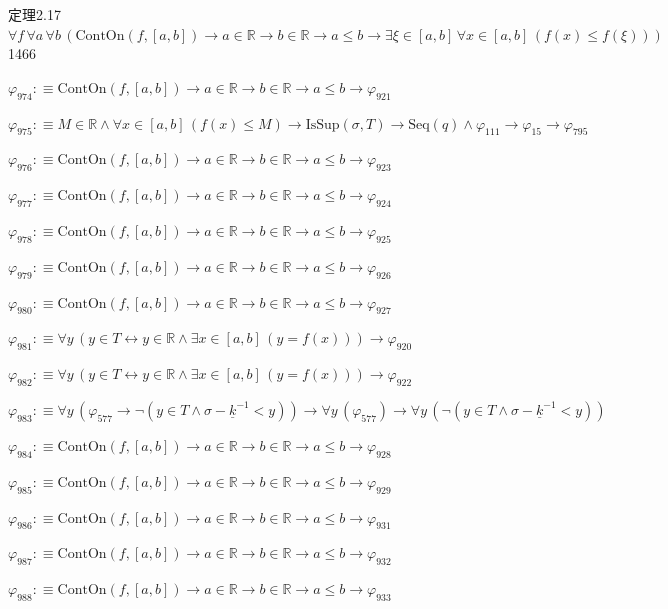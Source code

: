 \begin{fullproof}{定理2.17}{$\forall f\,\forall a\,\forall b\,(\mathrm{ContOn}(f,[a,b]) \to a \in \mathbb{R} \to b \in \mathbb{R} \to a \leq b \to \exists \xi \in [a,b]\,\forall x \in [a,b]\,(f(x) \leq f(\xi)))$}{1466}
\begin{abbrevlist}
\item $\varphi_{974} :\equiv \mathrm{ContOn}(f,[a,b]) \to a \in \mathbb{R} \to b \in \mathbb{R} \to a \leq b \to \varphi_{921}$
\item $\varphi_{975} :\equiv M \in \mathbb{R} \land \forall x \in [a,b]\,(f(x) \leq M) \to \mathrm{IsSup}(\sigma,T) \to \mathrm{Seq}(q) \land \varphi_{111} \to \varphi_{15} \to \varphi_{795}$
\item $\varphi_{976} :\equiv \mathrm{ContOn}(f,[a,b]) \to a \in \mathbb{R} \to b \in \mathbb{R} \to a \leq b \to \varphi_{923}$
\item $\varphi_{977} :\equiv \mathrm{ContOn}(f,[a,b]) \to a \in \mathbb{R} \to b \in \mathbb{R} \to a \leq b \to \varphi_{924}$
\item $\varphi_{978} :\equiv \mathrm{ContOn}(f,[a,b]) \to a \in \mathbb{R} \to b \in \mathbb{R} \to a \leq b \to \varphi_{925}$
\item $\varphi_{979} :\equiv \mathrm{ContOn}(f,[a,b]) \to a \in \mathbb{R} \to b \in \mathbb{R} \to a \leq b \to \varphi_{926}$
\item $\varphi_{980} :\equiv \mathrm{ContOn}(f,[a,b]) \to a \in \mathbb{R} \to b \in \mathbb{R} \to a \leq b \to \varphi_{927}$
\item $\varphi_{981} :\equiv \forall y\,(y \in T \leftrightarrow y \in \mathbb{R} \land \exists x \in [a,b]\,(y = f(x))) \to \varphi_{920}$
\item $\varphi_{982} :\equiv \forall y\,(y \in T \leftrightarrow y \in \mathbb{R} \land \exists x \in [a,b]\,(y = f(x))) \to \varphi_{922}$
\item $\varphi_{983} :\equiv \forall y\,(\varphi_{577} \to \neg (y \in T \land \sigma - \underline{k}^{-1} < y)) \to \forall y\,(\varphi_{577}) \to \forall y\,(\neg (y \in T \land \sigma - \underline{k}^{-1} < y))$
\item $\varphi_{984} :\equiv \mathrm{ContOn}(f,[a,b]) \to a \in \mathbb{R} \to b \in \mathbb{R} \to a \leq b \to \varphi_{928}$
\item $\varphi_{985} :\equiv \mathrm{ContOn}(f,[a,b]) \to a \in \mathbb{R} \to b \in \mathbb{R} \to a \leq b \to \varphi_{929}$
\item $\varphi_{986} :\equiv \mathrm{ContOn}(f,[a,b]) \to a \in \mathbb{R} \to b \in \mathbb{R} \to a \leq b \to \varphi_{931}$
\item $\varphi_{987} :\equiv \mathrm{ContOn}(f,[a,b]) \to a \in \mathbb{R} \to b \in \mathbb{R} \to a \leq b \to \varphi_{932}$
\item $\varphi_{988} :\equiv \mathrm{ContOn}(f,[a,b]) \to a \in \mathbb{R} \to b \in \mathbb{R} \to a \leq b \to \varphi_{933}$

\end{abbrevlist}
\end{fullproof}
